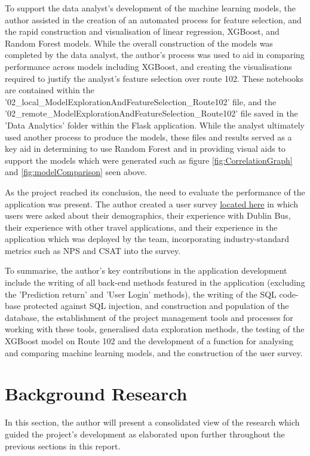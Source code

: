 \documentclass[]{UCD_CS_47360_Report}
\begin{document}
To support the data analyst's development of the machine learning models, the author assisted in the creation of an automated process for feature selection, and the rapid construction and visualisation of linear regression, XGBoost, and Random Forest models. While the overall construction of the models was completed by the data analyst, the author's process was used to aid in comparing performance across models including XGBoost, and creating the visualisations required to justify the analyst's feature selection over route 102. These notebooks are contained within the '02\_local\_ModelExplorationAndFeatureSelection\_Route102' file, and the  '02\_remote\_ModelExplorationAndFeatureSelection\_Route102' file saved in the 'Data Analytics' folder within the Flask application. While the analyst ultimately used another process to produce the models, these files and results served as a key aid in determining to use Random Forest and in providing visual aids to support the models which were generated such as figure \ref{fig:CorrelationGraph} and \ref{fig:modelComparison} seen above.

As the project reached its conclusion, the need to evaluate the performance of the application was present. The author created a user survey \href{https://forms.gle/YRaKCK1pR4amfdYm7}{located here} in which users were asked about their demographics, their experience with Dublin Bus, their experience with other travel applications, and their experience in the application which was deployed by the team, incorporating industry-standard metrics such as NPS \cite{NPS} and CSAT \cite{CSAT} into the survey.

To summarise, the author's key contributions in the application development include the writing of all back-end methods featured in the application (excluding the 'Prediction return' and 'User Login' methods), the writing of the SQL code-base protected against SQL injection, and construction and population of the database, the establishment of the project management tools and processes for working with these tools, generalised data exploration methods, the testing of the XGBoost model on Route 102 and the development of a function for analysing and comparing machine learning models, and the construction of the user survey.

\chapter{\label{chapter7}Background Research}
In this section, the author will present a consolidated view of the research which guided the project's development as elaborated upon further throughout the previous sections in this report.
\end{document}
